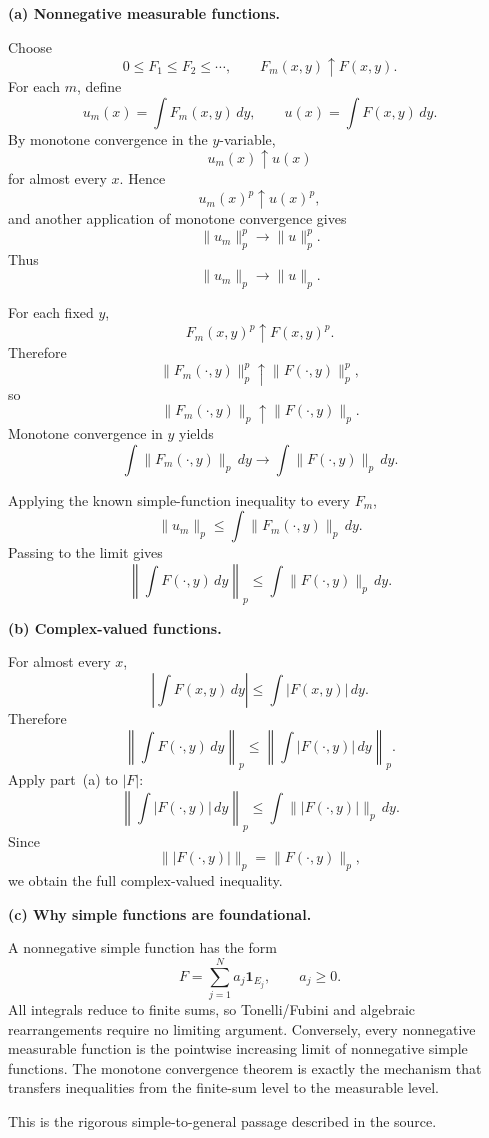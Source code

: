 \begin{solution}
\par\smallskip\noindent\textbf{(a) Nonnegative measurable functions.}

Choose
\[
0\le F_1\le F_2\le\cdots,
\qquad
F_m(x,y)\uparrow F(x,y).
\]
For each \(m\), define
\[
u_m(x)
=
\int F_m(x,y)\,dy,
\qquad
u(x)
=
\int F(x,y)\,dy.
\]
By monotone convergence in the \(y\)-variable,
\[
u_m(x)\uparrow u(x)
\]
for almost every \(x\). Hence
\[
u_m(x)^p\uparrow u(x)^p,
\]
and another application of monotone convergence gives
\[
\|u_m\|_p^p
\longrightarrow
\|u\|_p^p.
\]
Thus
\[
\|u_m\|_p\longrightarrow\|u\|_p.
\]

For each fixed \(y\),
\[
F_m(x,y)^p\uparrow F(x,y)^p.
\]
Therefore
\[
\|F_m(\cdot,y)\|_p^p
\uparrow
\|F(\cdot,y)\|_p^p,
\]
so
\[
\|F_m(\cdot,y)\|_p
\uparrow
\|F(\cdot,y)\|_p.
\]
Monotone convergence in \(y\) yields
\[
\int
\|F_m(\cdot,y)\|_p\,dy
\longrightarrow
\int
\|F(\cdot,y)\|_p\,dy.
\]

Applying the known simple-function inequality to every \(F_m\),
\[
\|u_m\|_p
\le
\int
\|F_m(\cdot,y)\|_p\,dy.
\]
Passing to the limit gives
\[
\boxed{
\left\|
\int F(\cdot,y)\,dy
\right\|_p
\le
\int
\|F(\cdot,y)\|_p\,dy.}
\]

\par\smallskip\noindent\textbf{(b) Complex-valued functions.}

For almost every \(x\),
\[
\left|
\int F(x,y)\,dy
\right|
\le
\int|F(x,y)|\,dy.
\]
Therefore
\[
\left\|
\int F(\cdot,y)\,dy
\right\|_p
\le
\left\|
\int |F(\cdot,y)|\,dy
\right\|_p.
\]
Apply part~(a) to \(|F|\):
\[
\left\|
\int |F(\cdot,y)|\,dy
\right\|_p
\le
\int
\||F(\cdot,y)|\|_p\,dy.
\]
Since
\[
\||F(\cdot,y)|\|_p
=
\|F(\cdot,y)\|_p,
\]
we obtain the full complex-valued inequality.

\par\smallskip\noindent\textbf{(c) Why simple functions are foundational.}

A nonnegative simple function has the form
\[
F
=
\sum_{j=1}^N
a_j\mathbf1_{E_j},
\qquad
a_j\ge0.
\]
All integrals reduce to finite sums, so Tonelli/Fubini and algebraic
rearrangements require no limiting argument. Conversely, every
nonnegative measurable function is the pointwise increasing limit of
nonnegative simple functions. The monotone convergence theorem is exactly
the mechanism that transfers inequalities from the finite-sum level to
the measurable level.

This is the rigorous simple-to-general passage described in the source.
\end{solution}



